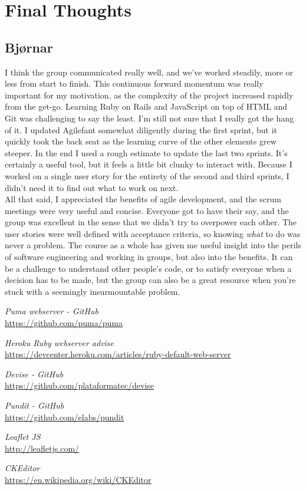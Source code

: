\documentclass[a4paper]{article}
\begin{document}
\section{Final Thoughts}

\subsection{Bjørnar}
I think the group communicated really well, and we've worked steadily, more or less from start to finish. This continuous forward momentum was really important for my motivation, as the complexity of the project increased rapidly from the get-go. Learning Ruby on Rails and JavaScript on top of HTML and Git was challenging to say the least. I'm still not sure that I really got the hang of it. I updated Agilefant somewhat diligently during the first sprint, but it quickly took the back seat as the learning curve of the other elements grew steeper. In the end I used a rough estimate to update the last two sprints. It's certainly a useful tool, but it feels a little bit clunky to interact with. Because I worked on a single user story for the entirety of the second and third sprints, I didn't need it to find out what to work on next.\\

\noindent
All that said, I appreciated the benefits of agile development, and the scrum meetings were very useful and concise. Everyone got to have their say, and the group was excellent in the sense that we didn't try to overpower each other. The user stories were well defined with acceptance criteria, so knowing \textit{what} to do was never a problem. The course as a whole has given me useful insight into the perils of software engineering and working in groups, but also into the benefits. It can be a challenge to understand other people's code, or to satisfy everyone when a decision has to be made, but the group can also be a great resource when you're stuck with a seemingly insurmountable problem.

\begin{thebibliography}{9}
\emph{Puma webserver - GitHub}\\
\url{https://github.com/puma/puma}

\emph{Heroku Ruby webserver advise}\\
\url {https://devcenter.heroku.com/articles/ruby-default-web-server}

\emph{Devise - GitHub}\\
\url{https://github.com/plataformatec/devise}


\emph{Pundit - GitHub}\\
\url{https://github.com/elabs/pundit}


\emph{Leaflet JS}\\
\url{http://leafletjs.com/}

\emph{CKEditor}\\
\url{https://en.wikipedia.org/wiki/CKEditor}

\end{thebibliography}
\end{document}
